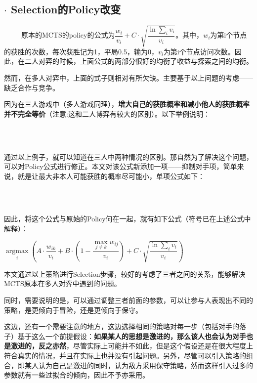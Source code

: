\documentclass[9pt,twocolumn,twoside]{osajnl}
\begin{document}
\subsection{$\cdot$ Selection的Policy改变}
\begin{adjustwidth}{2em}{}
\ \ \ \ \ 原本的MCTS的policy的公式为$\dfrac{w_i}{v_i}+C\cdot\sqrt{\dfrac{\ln{\sum_{i}v_i}}{v_i}}$。其中，$w_i$为第i个节点的获胜的次数，每次获胜记为1，平局0.5，输为0，$v_i$为第i个节点访问次数。因此，在二人对弈的时候，上面公式的两部分很好的均衡了收益与探索之间的均衡。

然而，在多人对弈中，上面的式子则相对有所欠缺。主要基于以上问题的考虑——缺乏合作与竞争。

因为在三人游戏中（多人游戏同理），\textbf{增大自己的获胜概率和减小他人的获胜概率并不完全等价}（注意:这和二人博弈有较大的区别）。以下举例说明：

\



\ \\


通过以上例子，就可以知道在三人中两种情况的区别。那自然为了解决这个问题，可以对Policy公式进行修正。本文对该公式新添加一项——抑制对手项，简单来说，就是让最大非本人可能获胜的概率尽可能小，单项公式如下：

\


\ \\

因此，将这个公式与原始的Policy何在一起，就有如下公式（符号已在上述公式中解释）：

$\mathop{argmax}\limits_i(A\cdot \dfrac{w_{ik}}{v_i}+B\cdot(1-\dfrac{\max\limits_{j\neq k}w_{ij}}{v_i})+C\cdot\sqrt{\dfrac{\ln{\sum_{i}v_i}}{v_i}})$

本文通过以上策略进行Selection步骤，较好的考虑了三者之间的关系，能够解决MCTS原本在多人对弈中遇到的问题。

同时，需要说明的是，可以通过调整三者前面的参数，可以让参与人表现出不同的策略，是更倾向于冒险，还是更倾向于保守。

这边，还有一个需要注意的地方，这边选择相同的策略对每一步（包括对手的落子）基于这么一个前提假设：\textbf{如果某人的思想是激进的，那么该人也会认为对手也是激进的，反之亦然}，尽管实际上可能并不如此，但是这个假设还是在很大程度上符合真实的情况，并且在实际上也并没有引起问题。另外，尽管可以引入策略的组合，即某人认为自己是激进的同时，认为敌方采用保守策略，然而这样引入过多的参数就有一些过拟合的倾向，因此不予亦采用。
\end{adjustwidth}
\end{document}
